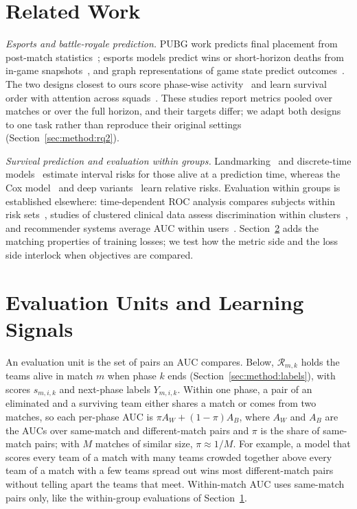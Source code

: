 \documentclass[sigconf,anonymous,nonacm]{acmart}
\begin{document}
\section{Related Work}
\label{sec:related}
\emph{Esports and battle-royale prediction.} PUBG work predicts final placement from post-match statistics~\cite{KagglePUBG,LeeLee25}; esports models predict wins or short-horizon deaths from in-game snapshots~\cite{Hodge21,Katona19,Marshall22}, and graph representations of game state predict outcomes~\cite{Xenopoulos21}. The two designs closest to ours score phase-wise activity~\cite{Sagong25a} and learn survival order with attention across squads~\cite{KRAFTON}. These studies report metrics pooled over matches or over the full horizon, and their targets differ; we adapt both designs to one task rather than reproduce their original settings (Section~\ref{sec:method:rq2}).

\emph{Survival prediction and evaluation within groups.} Landmarking~\cite{vanHouwelingen07} and discrete-time models~\cite{SingerWillett93,Gensheimer19} estimate interval risks for those alive at a prediction time, whereas the Cox model~\cite{Cox72} and deep variants~\cite{DeepHit18,DynamicDeepHit20} learn relative risks. Evaluation within groups is established elsewhere: time-dependent ROC analysis compares subjects within risk sets~\cite{HeagertyZheng05}, studies of clustered clinical data assess discrimination within clusters~\cite{vanKlaveren14}, and recommender systems average AUC within users~\cite{Zhou18}. Section~\ref{sec:account} adds the matching properties of training losses; we test how the metric side and the loss side interlock when objectives are compared.

\section{Evaluation Units and Learning Signals}
\label{sec:account}
An evaluation unit is the set of pairs an AUC compares. Below, $\mathcal{R}_{m,k}$ holds the teams alive in match $m$ when phase $k$ ends (Section~\ref{sec:method:labels}), with scores $s_{m,i,k}$ and next-phase labels $Y_{m,i,k}$. Within one phase, a pair of an eliminated and a surviving team either shares a match or comes from two matches, so each per-phase AUC is $\pi A_W+(1-\pi)A_B$, where $A_W$ and $A_B$ are the AUCs over same-match and different-match pairs and $\pi$ is the share of same-match pairs; with $M$ matches of similar size, $\pi\approx1/M$. For example, a model that scores every team of a match with many teams crowded together above every team of a match with a few teams spread out wins most different-match pairs without telling apart the teams that meet. Within-match AUC uses same-match pairs only, like the within-group evaluations of Section~\ref{sec:related}.
\end{document}
